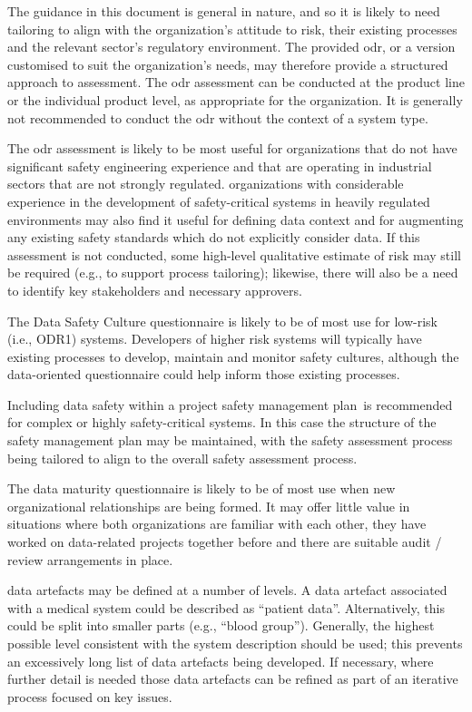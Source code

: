 The guidance in this document is general in nature, and so it is likely to need \gls{tailoring} to align with the organization's attitude to risk, their existing processes and the relevant sector's regulatory environment. The provided \gls{odr}, or a version customised to suit the organization's needs, may therefore provide a structured approach to assessment.
The \gls{odr} assessment can be conducted at the product line or the individual product level, as appropriate for the organization. It is generally not recommended to conduct the \gls{odr} without the context of a system type.

The \gls{odr} assessment is likely to be most useful for organizations that do not have significant safety engineering experience and that are operating in industrial sectors that are not strongly regulated.
organizations with considerable experience in the development of safety-critical systems in heavily regulated environments
may also find it useful for defining data context and for augmenting any existing safety standards which do not explicitly consider data.
If this assessment is not conducted, some high-level qualitative estimate of risk may still be required (e.g., to support process \gls{tailoring}); likewise, there will also be a need to identify key \glspl{stakeholder} and necessary approvers.

The Data Safety Culture questionnaire is likely to be of most use for low-risk (i.e., ODR1) systems. Developers of higher risk systems will typically have existing processes to develop, maintain and monitor safety cultures, although the data-oriented questionnaire could help inform those existing processes.

Including data safety within a project safety management plan\ is recommended for complex or highly safety-critical systems. In this case the structure of the safety management plan may be maintained, with the \gls{safety assessment} process being tailored to align to the overall safety assessment process.

The data maturity questionnaire is likely to be of most use when new organizational relationships are being formed. It may offer little value in situations where both organizations are familiar with each other, they have worked on data-related projects together before and there are suitable audit / review arrangements in place.

\Glspl{data artefact} may be defined at a number of levels. A \gls{data artefact} associated with a medical system could be described as ``patient data''. Alternatively, this could be split into smaller parts (e.g., ``blood group''). Generally, the highest possible level consistent with the system description should be used; this prevents an excessively long list of \glspl{data artefact} being developed. If necessary, where further detail is needed those \glspl{data artefact} can be refined as part of an iterative process focused on key issues.

